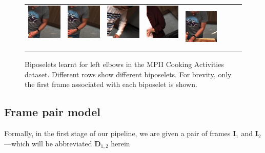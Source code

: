 \documentclass[runningheads]{llncs}
\newcommand{\mat}{\mathbf}
\begin{document}
\begin{figure}[t]
\begin{center}
\begin{tabular}{@{}c@{}c@{}c@{}c@{}c@{}c@{}c@{}c@{}}
\includegraphics[height=0.1375\linewidth]{figures/biposelets/poselet-297/sample-3-f0.jpg}\,&
\includegraphics[height=0.1375\linewidth]{figures/biposelets/poselet-297/sample-4-f0.jpg}\,&
\includegraphics[height=0.1375\linewidth]{figures/biposelets/poselet-297/sample-5-f0.jpg}\,&
\includegraphics[height=0.1375\linewidth]{figures/biposelets/poselet-297/sample-6-f0.jpg}\,&
\includegraphics[height=0.1375\linewidth]{figures/biposelets/poselet-297/sample-7-f0.jpg}\\
\end{tabular}
\end{center}
\caption{Biposelets learnt for left elbows in the MPII Cooking Activities
dataset. Different rows show different biposelets. For brevity,
only the first frame associated with each biposelet is shown.}
\label{fig:biposelets}
\end{figure}


\subsection{Frame pair model}

Formally, in the first stage of our pipeline, we are given a pair of frames
$\mat I_1$ and $\mat I_2$---which will be abbreviated $\mat D_{1,2}$ herein
\end{document}
